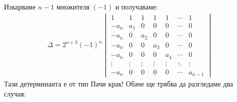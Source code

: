 \documentclass[a4paper, 12pt, oneside]{article}
\begin{document}
Изкарваме \(n - 1\) множителя \((-1)\) и получаваме:
\begin{align*}
\Delta = 2^{n + 3}(-1)^n\begin{vmatrix}
    1 & 1 & 1 & 1 & 1 & \cdots & 1 \\
    -a_n & a_1 & 0 & 0 & 0 & \cdots & 0 \\
    -a_n & 0 & a_2 & 0 & 0 & \cdots & 0 \\
    -a_n & 0 & 0 & a_3 & 0 & \cdots & 0 \\
    -a_n & 0 & 0 & 0 & a_4 & \cdots & 0 \\
    \vdots & \vdots & \vdots & \vdots & \vdots & \ddots & \vdots \\
    -a_n & 0 & 0 & 0 & 0 & \cdots & a_{n - 1}
\end{vmatrix}
\end{align*}
Тази детерминанта е от тип Пачи крак! Обаче ще трябва да разгледаме два случая:
\end{document}
